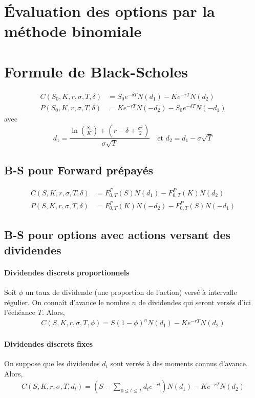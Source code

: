 \documentclass[10pt, french]{article}
\begin{document}
\begin{multicols*}{2}
\section{Évaluation des options par la méthode binomiale}


\section{Formule de Black-Scholes}
\begin{align*}
C(S_0, K, r, \sigma, T, \delta) & = S_0 e^{-\delta T} N(d_1) - K e^{-rT} N(d_2) \\
P(S_0, K, r, \sigma, T, \delta) & = K e^{-rT} N(-d_2) - S_0 e^{-\delta T} N(-d_1)
\end{align*}
avec 
\[d_1 = \frac{\ln \left( \frac{S_0}{K}  \right) + \left( r - \delta + \frac{\sigma^2}{2} \right) }{\sigma \sqrt{T}}  \ \ \  \text{ et } d_2 = d_1 - \sigma \sqrt{T}\]

\subsection*{B-S pour Forward prépayés}
\begin{align*}
C(S, K, r, \sigma, T , \delta) & = F_{0,T}^{P}(S) N(d_1) - F_{0,T}^{P}(K) N(d_2) \\
P(S, K, r, \sigma, T , \delta)  & = F_{0,T}^{P}(K) N(-d_2) - F_{0,T}^{P}(S) N(-d_1)
\end{align*}

\subsection*{B-S pour options avec actions versant des dividendes}

\paragraph{Dividendes discrets proportionnels} Soit $\phi$ un taux de dividende (une proportion de l'action) versé à intervalle régulier. On connaît d'avance le nombre $n$ de dividendes qui seront versés d'ici l'échéance $T$. Alors,
\begin{align*}
C(S, K, r, \sigma, T , \phi) = S(1 - \phi)^{n} N(d_1) - K e^{-rT} N(d_2)
\end{align*}

\paragraph{Dividendes discrets fixes} On suppose que les dividendes $d_t$ sont verrés à des moments connus d'avance. Alors,
\begin{align*}
C(S, K, r, \sigma, T , d_t) = \left( S - \sum_{0 \leq t \leq T} d_t e^{-rt}  \right) N(d_1) - K e^{-rT} N(d_2)
\end{align*}


\end{multicols*}
\end{document}
